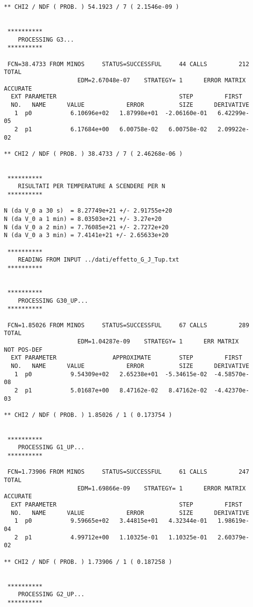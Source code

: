 {\begin{verbatim}
** CHI2 / NDF ( PROB. ) 54.1923 / 7 ( 2.1546e-09 )


 **********
    PROCESSING G3...
 **********

 FCN=38.4733 FROM MINOS     STATUS=SUCCESSFUL     44 CALLS         212 TOTAL
                     EDM=2.67048e-07    STRATEGY= 1      ERROR MATRIX ACCURATE 
  EXT PARAMETER                                   STEP         FIRST   
  NO.   NAME      VALUE            ERROR          SIZE      DERIVATIVE 
   1  p0           6.10696e+02   1.87998e+01  -2.06160e-01   6.42299e-05
   2  p1           6.17684e+00   6.00758e-02   6.00758e-02   2.09922e-02

** CHI2 / NDF ( PROB. ) 38.4733 / 7 ( 2.46268e-06 )


 **********
    RISULTATI PER TEMPERATURE A SCENDERE PER N
 **********

N (da V_0 a 30 s)  = 8.27749e+21 +/- 2.91755e+20
N (da V_0 a 1 min) = 8.03503e+21 +/- 3.27e+20
N (da V_0 a 2 min) = 7.76085e+21 +/- 2.7272e+20
N (da V_0 a 3 min) = 7.4141e+21 +/- 2.65633e+20

 **********
    READING FROM INPUT ../dati/effetto_G_J_Tup.txt
 **********


 **********
    PROCESSING G30_UP...
 **********

 FCN=1.85026 FROM MINOS     STATUS=SUCCESSFUL     67 CALLS         289 TOTAL
                     EDM=1.04287e-09    STRATEGY= 1      ERR MATRIX NOT POS-DEF
  EXT PARAMETER                APPROXIMATE        STEP         FIRST   
  NO.   NAME      VALUE            ERROR          SIZE      DERIVATIVE 
   1  p0           9.54309e+02   2.65238e+01  -5.34615e-02  -4.58570e-08
   2  p1           5.01687e+00   8.47162e-02   8.47162e-02  -4.42370e-03

** CHI2 / NDF ( PROB. ) 1.85026 / 1 ( 0.173754 )


 **********
    PROCESSING G1_UP...
 **********

 FCN=1.73906 FROM MINOS     STATUS=SUCCESSFUL     61 CALLS         247 TOTAL
                     EDM=1.69866e-09    STRATEGY= 1      ERROR MATRIX ACCURATE 
  EXT PARAMETER                                   STEP         FIRST   
  NO.   NAME      VALUE            ERROR          SIZE      DERIVATIVE 
   1  p0           9.59665e+02   3.44815e+01   4.32344e-01   1.98619e-04
   2  p1           4.99712e+00   1.10325e-01   1.10325e-01   2.60379e-02

** CHI2 / NDF ( PROB. ) 1.73906 / 1 ( 0.187258 )


 **********
    PROCESSING G2_UP...
 **********


\end{verbatim}}
